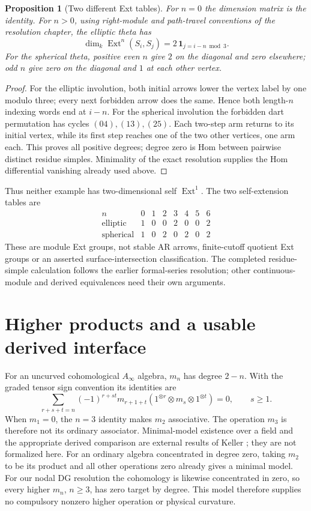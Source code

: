 \documentclass[11pt,oneside,openany]{book}
\newtheorem{proposition}[theorem]{Proposition}
\theoremstyle{definition}\newtheorem{definition}[theorem]{Definition}
\theoremstyle{remark}\newtheorem{remark}[theorem]{Remark}
\begin{document}
\begin{proposition}[Two different Ext tables]\label{dg:theta-ext}
For $n=0$ the dimension matrix is the identity. For $n>0$, using right-module
and path-travel conventions of the resolution chapter, the elliptic theta has
\[
 \dim_k\operatorname{Ext}^n(S_i,S_j)
    =2\,\mathbf1_{j=i-n\bmod3}.
\]
For the spherical theta, positive even $n$ give $2$ on the diagonal and zero
elsewhere; odd $n$ give zero on the diagonal and $1$ at each other vertex.
\end{proposition}
\begin{proof}
For the elliptic involution, both initial arrows lower the vertex label by
one modulo three; every next forbidden arrow does the same. Hence both
length-$n$ indexing words end at $i-n$. For the spherical involution the
forbidden dart permutation has cycles $(04),(13),(25)$. Each two-step arm
returns to its initial vertex, while its first step reaches one of the two
other vertices, one arm each. This proves all positive degrees; degree zero
is Hom between pairwise distinct residue simples. Minimality of the exact
resolution supplies the Hom differential vanishing already used above.
\end{proof}
Thus neither example has two-dimensional self $\operatorname{Ext}^1$.
The two self-extension tables are
\[
\begin{array}{c|rrrrrrr}
n&0&1&2&3&4&5&6\\\hline
\text{elliptic}&1&0&0&2&0&0&2\\
\text{spherical}&1&0&2&0&2&0&2
\end{array}
\]
These are module Ext groups, not stable AR arrows, finite-cutoff quotient
Ext groups or an asserted surface-intersection classification. The completed
residue-simple calculation follows the earlier formal-series resolution;
other continuous-module and derived equivalences need their own arguments.

\section{Higher products and a usable derived interface}
For an uncurved cohomological $A_\infty$ algebra, $m_n$ has degree $2-n$.
With the graded tensor sign convention its identities are
\[
 \sum_{r+s+t=n}(-1)^{r+st}
 m_{r+1+t}(1^{\otimes r}\otimes m_s\otimes1^{\otimes t})=0,
 \qquad s\ge1.
\]
When $m_1=0$, the $n=3$ identity makes $m_2$ associative. The operation
$m_3$ is therefore not its ordinary associator. Minimal-model existence
over a field and the appropriate derived comparison are external results
of Keller \cite[\S\S3.1,3.3,6.2]{KellerAinf}; they are not formalized here.
For an ordinary algebra concentrated in degree zero, taking $m_2$ to be
its product and all other operations zero already gives a minimal model.
For our nodal DG resolution the cohomology is likewise concentrated in zero,
so every higher $m_n$, $n\ge3$, has zero target by degree. This model
therefore supplies no compulsory nonzero higher operation or physical
curvature.
\end{document}
